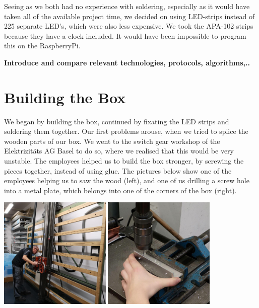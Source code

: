 \documentclass[a4paper,12pt]{article}
\begin{document}
 Seeing as we both had no experience with soldering, especially as it would have taken all of the available project time, we decided on using LED-strips instead of 225 separate LED's, which were also less expensive.
 We took the APA-102 strips because they have a clock included.
 It would have been impossible to program this on the RaspberryPi.
 
 \textbf{Introduce and compare relevant technologies, protocols,
algorithms,..}

\section{Building the Box}
We began by building the box, continued by fixating the LED strips and soldering them together.
 Our first problems arouse, when we tried to splice the wooden parts of our box.
 We went to the switch gear workshop of the Elektrizitäts AG Basel to do so, where we realised that this would be very unstable.
 The employees helped us to build the box stronger, by screwing the pieces together, instead of using glue.
 The pictures below show one of the employees helping us to saw the wood (left), and one of us drilling a screw hole into a metal plate, which belongs into one of the corners of the box (right).
 
\vspace{1cm}

{ \centering
  \includegraphics[width = 0.4\textwidth]{brice.jpg}
  \space{   }
  \includegraphics[width = 0.4\textwidth]{bohren.jpg}
  \\}
 \vspace{1cm}
 
\end{document}
